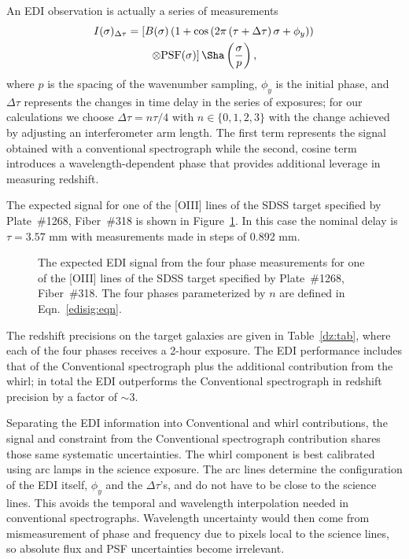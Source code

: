 \documentclass[preprint2, 10pt]{aastex}
\begin{document}
An EDI observation is actually a series of measurements
\begin{align}
I(\sigma)_{\Delta\tau} &= \left[B(\sigma)\left(1+\cos{\left(2\pi\left(\tau+\Delta \tau\right)\sigma+\phi_y \right)} \right) \right. \nonumber\\
&\qquad \left. \otimes \mbox{PSF}(\sigma)\right]\Sha\left(\frac{\sigma}{p}\right),
\label{edisig:eqn}
\end{align}
where $p$ is the spacing of the wavenumber sampling, $\phi_y$ is the initial phase,
and $\Delta \tau$ represents the changes in time delay in the series of exposures; for our calculations we choose  $\Delta \tau = n\tau/4$ with $n\in\{0,1,2,3\}$
with the change achieved by adjusting an interferometer arm length. 
The first term represents the signal obtained with a conventional spectrograph while the second, cosine term
introduces a wavelength-dependent phase that provides additional leverage in measuring redshift.


The expected signal for one of the [OIII] lines of the SDSS target specified by Plate~\#1268, Fiber~\#318 is shown
in Figure~\ref{edicounts:fig}.   In this case the nominal delay is $\tau = 3.57$ mm with measurements
made in steps of 0.892 mm.


\begin{figure}[t]
   \centering
   \caption{The expected EDI signal from the four phase measurements for one of the [OIII] lines of
   the SDSS target specified by Plate~\#1268, Fiber~\#318. The four phases parameterized by $n$ are defined in Eqn.~\ref{edisig:eqn}.
\label{edicounts:fig}}
\end{figure}


The redshift precisions on the target galaxies are given in Table~\ref{dz:tab}, where each of the four phases receives
a 2-hour exposure.  The EDI performance includes that of the Conventional spectrograph plus
the additional contribution from the whirl; in total the EDI outperforms the Conventional spectrograph
in redshift precision by a factor of $\sim 3$.

Separating the EDI information into Conventional and whirl contributions,
the signal and constraint from the Conventional spectrograph contribution shares those same systematic uncertainties.
The whirl component is best calibrated using arc lamps in the science exposure.  The arc lines determine the configuration
of the EDI itself, $\phi_y$ and the $\Delta \tau$'s, and do not have to be close
to the science lines.  This avoids the temporal and wavelength interpolation needed in conventional spectrographs.
Wavelength uncertainty would then come from mismeasurement of phase and frequency due to pixels local to the
science lines, so absolute flux and PSF uncertainties become irrelevant. 
\end{document}
